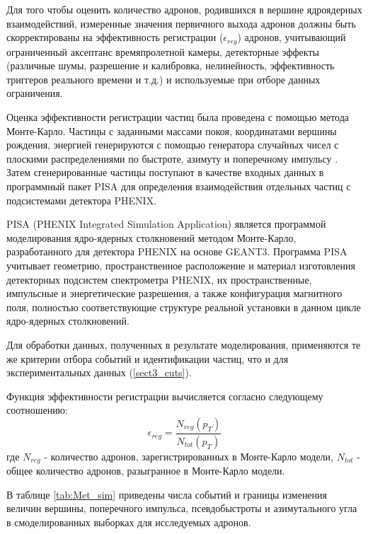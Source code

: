 Для того чтобы оценить количество адронов, родившихся в вершине ядроядерных взаимодействий, измеренные значения первичного выхода адронов должны быть скорректированы на эффективность регистрации ($\epsilon_{reg}$) адронов, учитывающий ограниченный аксептанс времяпролетной камеры, детекторные эффекты (различные шумы, разрешение и калибровка, нелинейность, эффективность триггеров реального времени и т.д.) и используемые при отборе данных ограничения.

Оценка эффективности регистрации частиц была проведена с помощью метода Монте-Карло.
Частицы с заданными массами покоя, координатами вершины рождения, энергией генерируются с помощью генератора  случайных чисел с плоскими распределениями по быстроте, азимуту и поперечному импульсу \pt. Затем сгенерированные частицы поступают в качестве входных данных в программный пакет PISA для определения взаимодействия отдельных частиц с подсистемами детектора PHENIX. 

PISA (PHENIX Integrated Simulation Application) является программой моделирования ядро-ядерных столкновений методом Монте-Карло, разработанного для детектора PHENIX на основе GEANT3.
Программа PISA учитывает геометрию, пространственное расположение и материал изготовления детекторных подсистем спектрометра PHENIX, их пространственные, импульсные и энергетические разрешения, а также конфигурация магнитного поля, полностью соответствующие структуре реальной установки в данном цикле ядро-ядерных столкновений.

Для обработки данных, полученных в результате моделирования, применяются те же критерии отбора событий и идентификации частиц, что и для экспериментальных данных (\ref{sect3_cuts}).

Функция эффективности регистрации вычисляется согласно следующему соотношению:
$$\epsilon_{reg} = \frac{N_{reg}(p_T)}{N_{tot}(p_T)}$$
где $N_{reg}$ - количество адронов, зарегистрированных в Монте-Карло модели, $N_{tot}$ - общее количество адронов, разыгранное в Монте-Карло модели.

В таблице \ref{tab:Met_sim} приведены числа событий и границы изменения величин вершины, поперечного импульса, псевдобыстроты и азимутального угла в смоделированных выборках для исследуемых адронов.

